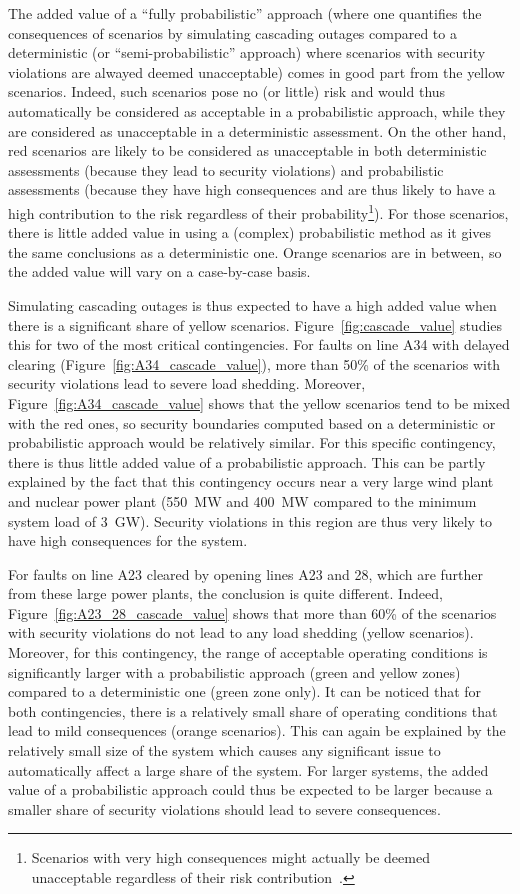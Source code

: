 The added value of a ``fully probabilistic'' approach (\ie where one quantifies the consequences of scenarios by simulating cascading outages compared to a deterministic (or ``semi-probabilistic'' approach) where scenarios with security violations are alwayed deemed unacceptable) comes in good part from the yellow scenarios. Indeed, such scenarios pose no (or little) risk and would thus automatically be considered as acceptable in a probabilistic approach, while they are considered as unacceptable in a deterministic assessment. On the other hand, red scenarios are likely to be considered as unacceptable in both deterministic assessments (because they lead to security violations) and probabilistic assessments (because they have high consequences and are thus likely to have a high contribution to the risk regardless of their probability\footnote{Scenarios with very high consequences might actually be deemed unacceptable regardless of their risk contribution~\cite{UCTE_Probabilistic}.}). For those scenarios, there is little added value in using a (complex) probabilistic method as it gives the same conclusions as a deterministic one. Orange scenarios are in between, so the added value will vary on a case-by-case basis.

Simulating cascading outages is thus expected to have a high added value when there is a significant share of yellow scenarios. Figure~\ref{fig:cascade_value} studies this for two of the most critical contingencies. For faults on line A34 with delayed clearing (Figure~\ref{fig:A34_cascade_value}), more than 50\% of the scenarios with security violations lead to severe load shedding. Moreover, Figure~\ref{fig:A34_cascade_value} shows that the yellow scenarios tend to be mixed with the red ones, so security boundaries computed based on a deterministic or probabilistic approach would be relatively similar. For this specific contingency, there is thus little added value of a probabilistic approach. This can be partly explained by the fact that this contingency occurs near a very large wind plant and nuclear power plant (550~MW and 400~MW compared to the minimum system load of 3~GW). Security violations in this region are thus very likely to have high consequences for the system.

For faults on line A23 cleared by opening lines A23 and 28, which are further from these large power plants, the conclusion is quite different. Indeed, Figure~\ref{fig:A23_28_cascade_value} shows that more than 60\% of the scenarios with security violations do not lead to any load shedding (yellow scenarios). Moreover, for this contingency, the range of acceptable operating conditions is significantly larger with a probabilistic approach (green and yellow zones) compared to a deterministic one (green zone only). It can be noticed that for both contingencies, there is a relatively small share of operating conditions that lead to mild consequences (orange scenarios). This can again be explained by the relatively small size of the system which causes any significant issue to automatically affect a large share of the system. For larger systems, the added value of a probabilistic approach could thus be expected to be larger because a smaller share of security violations should lead to severe consequences.

